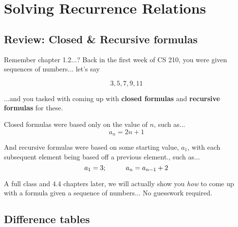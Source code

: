 
\newcommand{\laClass}       {CS 211}
\newcommand{\laSemester}    {Spring 2018}
\newcommand{\laChapter}     {5.}
\newcommand{\laType}        {Exercise}
\newcommand{\laPoints}      {5}
\newcommand{\laTitle}       {Solving Recurrence Relations}
\newcommand{\laDate}        {Jan 16, 2018}
\setcounter{chapter}{5}
\setcounter{section}{6}
\addtocounter{section}{-1}

\toggletrue{answerkey}
\togglefalse{answerkey}






    \section{\laTitle}

    \subsection{Review: Closed \& Recursive formulas}

    \begin{intro}{Remember chapter 1.2...?}
        Back in the first week of CS 210, you were given sequences of
        numbers... let's say

        $$ 3, 5, 7, 9, 11 $$

        ...and you tasked with coming up with \textbf{closed formulas}
        and \textbf{recursive formulas} for these.

        Closed formulas were based only on the value of $n$, such as...
        $$a_{n} = 2n + 1$$

        And recursive formulas were based on some starting value, $a_{1}$,
        with each subsequent element being based off a previous element., such as...
        $$ a_{1} = 3; \hspace*{1cm} a_{n} = a_{n-1} + 2 $$
    \end{intro}

    A full class and 4.4 chapters later, we will actually show you \textit{how} to
    come up with a formula given a sequence of numbers...
    No guesswork required.

    \newpage

    \subsection{Difference tables}

